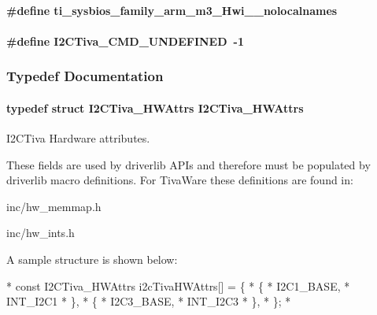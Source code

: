 \paragraph[{ti\-\_\-sysbios\-\_\-family\-\_\-arm\-\_\-m3\-\_\-\-Hwi\-\_\-\-\_\-nolocalnames}]{\setlength{\rightskip}{0pt plus 5cm}\#define ti\-\_\-sysbios\-\_\-family\-\_\-arm\-\_\-m3\-\_\-\-Hwi\-\_\-\-\_\-nolocalnames}\label{_i2_c_tiva_8h_aaa17ecf48f5762e2e1bdb0bab8aacf0c}
\paragraph[{I2\-C\-Tiva\-\_\-\-C\-M\-D\-\_\-\-U\-N\-D\-E\-F\-I\-N\-E\-D}]{\setlength{\rightskip}{0pt plus 5cm}\#define I2\-C\-Tiva\-\_\-\-C\-M\-D\-\_\-\-U\-N\-D\-E\-F\-I\-N\-E\-D~-\/1}\label{_i2_c_tiva_8h_aafc3a9be9d97cec76d1d0c2fd6124359}


\subsubsection{Typedef Documentation}
\paragraph[{I2\-C\-Tiva\-\_\-\-H\-W\-Attrs}]{\setlength{\rightskip}{0pt plus 5cm}typedef struct {\bf I2\-C\-Tiva\-\_\-\-H\-W\-Attrs}  {\bf I2\-C\-Tiva\-\_\-\-H\-W\-Attrs}}\label{_i2_c_tiva_8h_af20903ad2ff3e34d27132e11aef68ad5}


I2\-C\-Tiva Hardware attributes. 

These fields are used by driverlib A\-P\-Is and therefore must be populated by driverlib macro definitions. For Tiva\-Ware these definitions are found in\-:
\begin{DoxyItemize}
\item inc/hw\-\_\-memmap.\-h
\item inc/hw\-\_\-ints.\-h
\end{DoxyItemize}

A sample structure is shown below\-: 
\begin{DoxyCode}
*  \textcolor{keyword}{const} I2CTiva_HWAttrs i2cTivaHWAttrs[] = \{
*      \{
*          I2C1\_BASE,
*          INT\_I2C1
*      \},
*      \{
*          I2C3\_BASE,
*          INT\_I2C3
*      \},
*  \};
*  
\end{DoxyCode}
